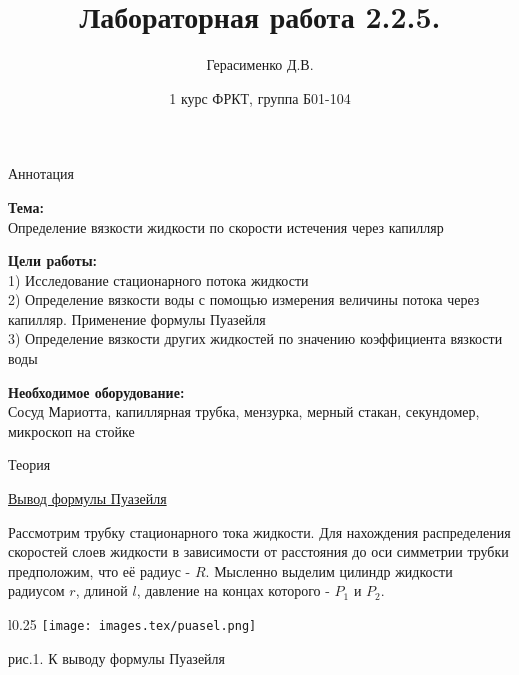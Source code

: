 \documentclass{article}
\title{
    \textbf{Лабораторная работа 2.2.5.}
}
\author{Герасименко Д.В.}
\date{1 курс ФРКТ, группа Б01-104}
\begin{document}
\maketitle

\begin{center}
    \raggedleft
    {
        \LARGE {Аннотация}
    }
    \hline
    \hline
\end{center}

\begin{center}
    \raggedright
    {
        \Large{\textbf{Тема:}}
        \\
    }
    \large {Определение вязкости жидкости по скорости истечения через капилляр}
\end{center}

\begin{center}
    \raggedright
    {
        \large{\textbf{Цели работы:}}
        \\
    }
    \large {1) Исследование стационарного потока жидкости}
    \\
    \large {2) Определение вязкости воды с помощью измерения величины потока через капилляр. Применение формулы Пуазейля}
    \\
    \large {3) Определение вязкости других жидкостей по значению коэффициента вязкости воды}
\end{center}

\begin{center}
    \raggedright
    {
        \large{\textbf{Необходимое оборудование:}}
        \\
    }
    \large {Сосуд Мариотта, капиллярная трубка, мензурка, мерный стакан, секундомер, микроскоп на стойке}
\end{center}

\begin{center}
    \raggedleft
    {
        \LARGE {Теория}
    }
    \hline
    \hline
\end{center}

\begin{center}
    \raggedright
    {
        \large{\underline{Вывод формулы Пуазейля}}
    }
\end{center}

Рассмотрим трубку стационарного тока жидкости. Для нахождения распределения скоростей слоев жидкости в зависимости от расстояния до оси симметрии трубки предположим, что её радиус - \(R\). Мысленно выделим цилиндр жидкости радиусом \(r\), длиной \(l\), давление на концах которого - \(P_{1}\) и \(P_{2}\).

\begin{wrapfigure}{l}{0.25\textwidth}
    \centering
    \texttt{[image: images.tex/puasel.png]}

    рис.1. К выводу формулы Пуазейля
\end{wrapfigure}
\end{document}
